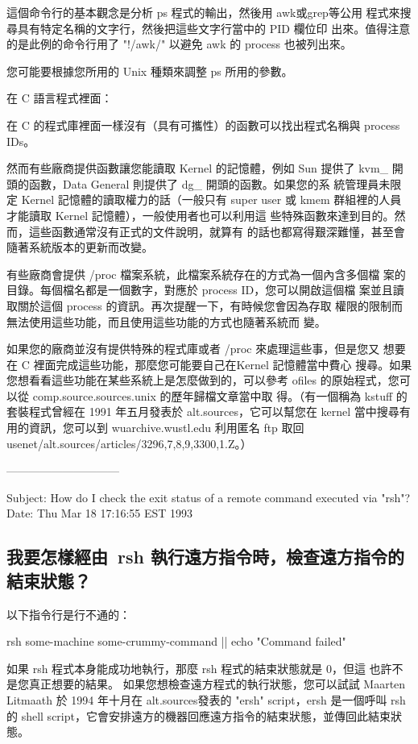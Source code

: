 \documentclass{article}
\begin{document}
\begin{CJK*}{Bg5}{ming}
	這個命令行的基本觀念是分析 ps 程式的輸出，然後用 awk或grep等公用
	程式來搜尋具有特定名稱的文字行，然後把這些文字行當中的 PID 欄位印
	出來。值得注意的是此例的命令行用了 "!/awk/" 以避免 awk 的 process 
	也被列出來。

	您可能要根據您所用的 Unix 種類來調整 ps 所用的參數。

	在 C 語言程式裡面：

	在 C 的程式庫裡面一樣沒有（具有可攜性）的函數可以找出程式名稱與 
	process IDs。

	然而有些廠商提供函數讓您能讀取 Kernel 的記憶體，例如 Sun 提供了 
	kvm\_ 開頭的函數，Data General 則提供了 dg\_ 開頭的函數。如果您的系
	統管理員未限定 Kernel 記憶體的讀取權力的話（一般只有 super user 或 
	kmem 群組裡的人員才能讀取 Kernel 記憶體），一般使用者也可以利用這
	些特殊函數來達到目的。然而，這些函數通常沒有正式的文件說明，就算有
	的話也都寫得艱深難懂，甚至會隨著系統版本的更新而改變。

	有些廠商會提供 /proc 檔案系統，此檔案系統存在的方式為一個內含多個檔
	案的目錄。每個檔名都是一個數字，對應於 process ID，您可以開啟這個檔
	案並且讀取關於這個 process 的資訊。再次提醒一下，有時候您會因為存取
	權限的限制而無法使用這些功能，而且使用這些功能的方式也隨著系統而
	變。

	如果您的廠商並沒有提供特殊的程式庫或者 /proc 來處理這些事，但是您又
	想要在 C 裡面完成這些功能，那麼您可能要自己在Kernel 記憶體當中費心
	搜尋。如果您想看看這些功能在某些系統上是怎麼做到的，可以參考 ofiles 
	的原始程式，您可以從 comp.source.sources.unix 的歷年歸檔文章當中取
	得。（有一個稱為 kstuff 的套裝程式曾經在 1991 年五月發表於 
	alt.sources，它可以幫您在 kernel 當中搜尋有用的資訊，您可以到 
	wuarchive.wustl.edu 利用匿名 ftp 取回 
	usenet/alt.sources/articles/{329{6,7,8,9},330{0,1}}.Z。）

------------------------------

Subject: How do I check the exit status of a remote command executed via "rsh"?
Date: Thu Mar 18 17:16:55 EST 1993

\subsection{我要怎樣經由~rsh 執行遠方指令時，檢查遠方指令的結束狀態？}

	以下指令行是行不通的：

	        rsh some-machine some-crummy-command || echo "Command failed"

	如果 rsh 程式本身能成功地執行，那麼 rsh 程式的結束狀態就是 0，但這
	也許不是您真正想要的結果。
	如果您想檢查遠方程式的執行狀態，您可以試試 Maarten Litmaath 於 1994
	年十月在 alt.sources發表的 "ersh" script，ersh 是一個呼叫 rsh 的 shell 
	script，它會安排遠方的機器回應遠方指令的結束狀態，並傳回此結束狀態。


\end{CJK*}
\end{document}
